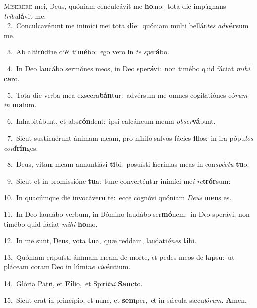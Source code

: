 \lettrine{\initial\textcolor{\initialcolor}{M}}{iserére} mei, Deus, quóniam conculcávit me \textbf{ho}\-mo:~\star tota die impúgnans \textit{tri}\-\textit{bu}\textbf{lá}vit me.\\
{\numbfont\textcolor{\numbcolor}{~2.}}~Conculcavérunt me inimíci mei tota \textbf{di}\-e:~\star quóniam multi bellán\textit{tes} \textit{ad}\-\textbf{vér}sum me.\par
{\numbfont\textcolor{\numbcolor}{~3.}}~Ab altitúdine diéi ti\-\textbf{mé}\-bo:~\star ego vero in \textit{te} \textit{spe}\-\textbf{rá}bo.\par
{\numbfont\textcolor{\numbcolor}{~4.}}~In Deo laudábo sermónes meos, in Deo spe\-\textbf{rá}\-vi:~\star non timébo quid fáciat \textit{mi}\-\textit{hi} \textbf{ca}\-ro.\par
{\numbfont\textcolor{\numbcolor}{~5.}}~Tota die verba mea exsecra\-\textbf{bán}\-tur:~\star advérsum me omnes cogitatiónes eó\textit{rum} \textit{in} \textbf{ma}\-lum.\par
{\numbfont\textcolor{\numbcolor}{~6.}}~Inhabitábunt, et abs\-\textbf{cón}\-dent:~\star ipsi calcáneum meum \textit{ob}\-\textit{ser}\textbf{vá}bunt.\par
{\numbfont\textcolor{\numbcolor}{~7.}}~Sicut sustinuérunt ánimam meam, pro níhilo salvos fácies \textbf{il}\-los:~\star in ira pópu\textit{los} \textit{con}\-\textbf{frín}ges.\par
{\numbfont\textcolor{\numbcolor}{~8.}}~Deus, vitam meam annuntiávi \textbf{ti}\-bi:~\star posuísti lácrimas meas in con\-\textit{spéc}\-\textit{tu} \textbf{tu}\-o.\par
{\numbfont\textcolor{\numbcolor}{~9.}}~Sicut et in promissióne \textbf{tu}\-a:~\star tunc converténtur inimíci me\textit{i} \textit{re}\-\textbf{trór}sum:\par
{\numbfont\textcolor{\numbcolor}{10.}}~In quacúmque die invocáve\textbf{ro} te:~\star ecce cognóvi quóniam \textit{De}\-\textit{us} \textbf{me}\-us es.\par
{\numbfont\textcolor{\numbcolor}{11.}}~In Deo laudábo verbum, in Dómino laudábo ser\-\textbf{mó}\-nem:~\star in Deo sperávi, non timébo quid fáciat \textit{mi}\-\textit{hi} \textbf{ho}\-mo.\par
{\numbfont\textcolor{\numbcolor}{12.}}~In me sunt, Deus, vota \textbf{tu}\-a,~\star quæ reddam, laudati\-\textit{ó}\-\textit{nes} \textbf{ti}\-bi.\par
{\numbfont\textcolor{\numbcolor}{13.}}~Quóniam eripuísti ánimam meam de morte, et pedes meos de \textbf{lap}\-su:~\star ut pláceam coram Deo in lúmi\textit{ne} \textit{vi}\-\textbf{vén}tium.\par
{\numbfont\textcolor{\numbcolor}{14.}}~Glória Patri, et \textbf{Fí}\-lio,~\star et Spirí\-\textit{tu}\-\textit{i} \textbf{Sanc}\-to.\par
{\numbfont\textcolor{\numbcolor}{15.}}~Sicut erat in princípio, et nunc, et \textbf{sem}\-per,~\star et in sǽcula sæcu\-\textit{ló}\-\textit{rum}. \textbf{A}\-men.\par
